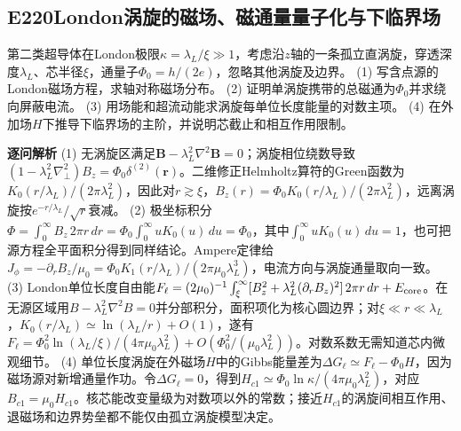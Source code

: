 \subsection*{E220\quad London涡旋的磁场、磁通量量子化与下临界场}
第二类超导体在London极限$\kappa=\lambda_L/\xi\gg1$，考虑沿$z$轴的一条孤立直涡旋，穿透深度$\lambda_L$、芯半径$\xi$，通量子$\Phi_0=h/(2e)$，忽略其他涡旋及边界。
(1) 写含点源的London磁场方程，求轴对称磁场分布。
(2) 证明单涡旋携带的总磁通为$\Phi_0$并求绕向屏蔽电流。
(3) 用场能和超流动能求涡旋每单位长度能量的对数主项。
(4) 在外加场$H$下推导下临界场的主阶，并说明芯截止和相互作用限制。
\par\textbf{逐问解析}
(1) 无涡旋区满足$\boldsymbol B-\lambda_L^2\nabla^2\boldsymbol B=0$；涡旋相位绕数导致$(1-\lambda_L^2\nabla_\perp^2)B_z=\Phi_0\delta^{(2)}(\boldsymbol r)$。二维修正Helmholtz算符的Green函数为$K_0(r/\lambda_L)/(2\pi\lambda_L^2)$，因此对$r\gtrsim\xi$，$B_z(r)=\Phi_0 K_0(r/\lambda_L)/(2\pi\lambda_L^2)$，远离涡旋按$e^{-r/\lambda_L}/\sqrt r$衰减。
(2) 极坐标积分$\Phi=\int_0^\infty B_z\,2\pi r\,dr=\Phi_0\int_0^\infty uK_0(u)\,du=\Phi_0$，其中$\int_0^\infty uK_0(u)\,du=1$，也可把源方程全平面积分得到同样结论。Ampere定律给$J_\phi=-\partial_rB_z/\mu_0=\Phi_0 K_1(r/\lambda_L)/(2\pi\mu_0\lambda_L^3)$，电流方向与涡旋通量取向一致。
(3) London单位长度自由能$F_\ell=(2\mu_0)^{-1}\int_\xi^\infty[B_z^2+\lambda_L^2(\partial_rB_z)^2]\,2\pi r\,dr+E_{\rm core}$。在无源区域用$B-\lambda_L^2\nabla^2B=0$并分部积分，面积项化为核心圆边界；对$\xi\ll r\ll\lambda_L$，$K_0(r/\lambda_L)\simeq\ln(\lambda_L/r)+O(1)$，遂有$F_\ell=\Phi_0^2\ln(\lambda_L/\xi)/(4\pi\mu_0\lambda_L^2)+O(\Phi_0^2/(\mu_0\lambda_L^2))$。对数系数无需知道芯内微观细节。
(4) 单位长度涡旋在外磁场$H$中的Gibbs能量差为$\Delta G_\ell\simeq F_\ell-\Phi_0H$，因为磁场源对新增通量作功。令$\Delta G_\ell=0$，得到$H_{c1}\simeq\Phi_0\ln\kappa/(4\pi\mu_0\lambda_L^2)$，对应$B_{c1}=\mu_0H_{c1}$。核芯能改变量级为对数项以外的常数；接近$H_{c1}$的涡旋间相互作用、退磁场和边界势垒都不能仅由孤立涡旋模型决定。
\par\medskip
